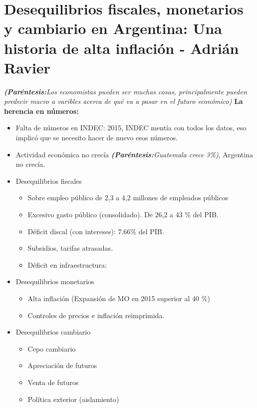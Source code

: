 \section{Desequilibrios fiscales, monetarios y cambiario en Argentina: Una historia de alta inflación - Adrián Ravier}
\emph{\textbf{(Paréntesis:}Los economistas pueden ser muchas cosas, principalmente pueden predecir macro a varibles acerca de qué va a pasar en el futuro económico)} \newline 
\textbf{La herencia en números:}
\begin{itemize}
    \item Falta de números en INDEC: 2015, INDEC mentía con todos los datos, eso implicó que se necesito hacer de nuevo esos números.
    \item Actividad económica no crecía \emph{\textbf{(Paréntesis:}Guatemala crece 3\%)}, Argentina no crecía.
    \item Desequilibrios fiscales
    \begin{itemize}
        \item Sobre empleo público de 2,3 a 4,2 millones de empleados públicos
        \item Excesivo gasto público (consolidado). De 26,2 a 43 \% del PIB.
        \item Déficit discal (con intereses): 7.66\% del PIB.
        \item Subsidios, tarifas atrasadas.
        \item Déficit en infraestructura:
    \end{itemize}
    \item Desequilibrios monetarios
    \begin{itemize}
        \item Alta inflación (Expansión de MO en 2015 superior al 40 \%)
        \item Controles de precios e inflación reimprimida.
    \end{itemize}
    \item Desequilibrios cambiario
    \begin{itemize}
        \item Cepo cambiario
        \item Apreciación de futuros 
        \item Venta de futuros
        \item Política exterior (aislamiento)
    \end{itemize}
\end{itemize}

